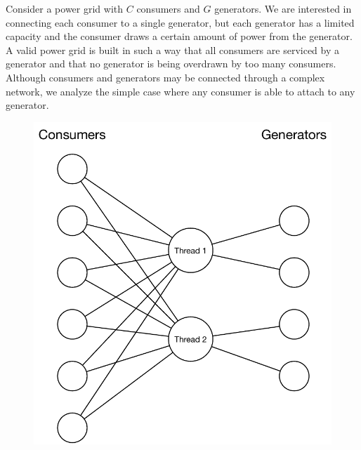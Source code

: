 Consider a power grid with $C$ consumers and $G$ generators. We are interested
in connecting each consumer to a single generator, but each generator has a
limited capacity and the consumer draws a certain amount of power from the
generator. A valid power grid is built in such a way that all consumers are
serviced by a generator and that no generator is being overdrawn by too many
consumers. Although consumers and generators may be connected through a complex
network, we analyze the simple case where any consumer is able to attach to any
generator.

\begin{figure}
   \begin{center}
      \includegraphics[width=1\linewidth]{figures/threads/powergrid.pdf}
   \end{center}
   \label{fig:threads:powergrid}
\end{figure}

